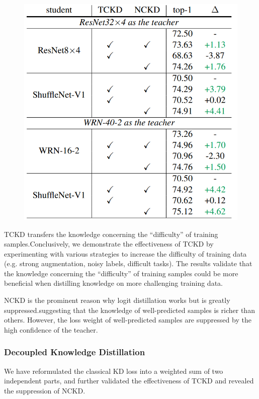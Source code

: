 \documentclass[11pt]{article}
\begin{document}
\begin{figure}[H]
	\centering
	\includegraphics[scale = 0.5]{103}
\end{figure}

TCKD transfers the knowledge concerning the “difficulty” of training samples.Conclusively, we demonstrate the effectiveness of TCKD by experimenting with various strategies to increase the difficulty of training data (e.g. strong augmentation, noisy labels, difficult tasks). The results validate that the knowledge concerning the “difficulty” of training samples could be more beneficial when distilling knowledge on more challenging training data.

NCKD is the prominent reason why logit distillation works but is greatly suppressed.suggesting that the knowledge of well-predicted samples is richer than others. However, the loss weight of well-predicted samples are suppressed by the high confidence of the teacher.
\subsubsection{Decoupled Knowledge Distillation}
We have reformulated the classical KD loss into a weighted sum of two independent parts, and further validated the effectiveness of TCKD and revealed the suppression of NCKD. 
\end{document}
